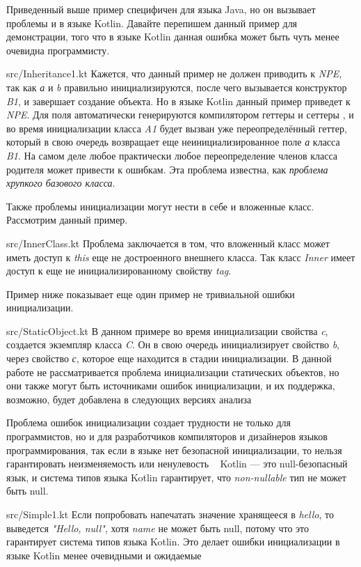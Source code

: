 Приведенный выше пример специфичен для языка Java, но он вызывает проблемы и в языке Kotlin.
Давайте перепишем данный пример для демонстрации,
того что в языке Kotlin данная ошибка может быть чуть менее очевидна программисту.

{src/Inheritance1.kt}
Кажется, что данный пример не должен приводить к \emph{NPE}, так как \emph{а} и \emph{b} правильно инициализируются,
после чего вызывается конструктор \emph{B1}, и завершает создание объекта.
Но в языке Kotlin данный пример приведет к \emph{NPE}.
Для поля автоматически генерируются компилятором геттеры и сеттеры
,
и во время инициализации класса \emph{A1} будет вызван уже переопределённый геттер,
который в свою очередь возвращает еще неинициализированное поле \emph{а} класса \emph{B1}.
На самом деле любое практически любое переопределение членов класса родителя может привести к ошибкам.
Эта проблема известна, как \textit{проблема хрупкого базового класса}\cite{fragile-base-class-problem}.

Также проблемы инициализации могут нести в себе и вложенные класс.
Рассмотрим данный пример.

{src/InnerClass.kt}
Проблема заключается в том, что вложенный класс может иметь доступ к \emph{this} еще не достроенного внешнего класса.
Так класс \emph{Inner} имеет доступ к еще не инициализированному свойству \emph{tag}.

Пример ниже показывает еще один пример не тривиальной ошибки инициализации.

{src/StaticObject.kt}
В данном примере во время инициализации свойства \emph{c}, создается экземпляр класса \emph{C}.
Он в свою очередь инициализирует свойство \emph{b}, через свойство \emph{с}, которое еще находится в стадии инициализации.
В данной работе не рассматривается проблема инициализации статических объектов,
но они также могут быть источниками ошибок инициализации, и их поддержка, возможно,
будет добавлена в следующих версиях анализа

Проблема ошибок инициализации создает трудности не только для программистов,
но и для разработчиков компиляторов и дизайнеров языков программирования,
так если в языке нет безопасной инициализации, то нельзя гарантировать неизменяемость или ненулевость
~\cite{joe-duffy}
Kotlin --- это null-безопасный язык, и система типов языка Kotlin гарантирует, что \emph{non-nullable} тип не может быть null.

{src/Simple1.kt}
Если попробовать напечатать значение хранящееся в \emph{hello}, то выведется \emph{"Hello, null"},
хотя \emph{name} не может быть null, потому что это гарантирует система типов языка Kotlin.
Это делает ошибки инициализации в языке Kotlin менее очевидными и ожидаемые


